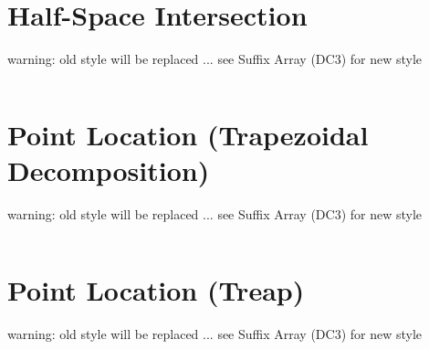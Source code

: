 \documentclass{book}
\begin{document}
\section{Half-Space Intersection}
warning: old style will be replaced ... see Suffix Array (DC3) for new style\begin{lstlisting}[language=C++,title={Half-Space Intersection.hpp (0 bytes, 0 lines)}]
\end{lstlisting}
\section{Point Location (Trapezoidal Decomposition)}
warning: old style will be replaced ... see Suffix Array (DC3) for new style\begin{lstlisting}[language=C++,title={Point Location (Trapezoidal Decomposition).hpp (0 bytes, 0 lines)}]
\end{lstlisting}
\section{Point Location (Treap)}
warning: old style will be replaced ... see Suffix Array (DC3) for new style\begin{lstlisting}[language=C++,title={Point Location (Treap).hpp (0 bytes, 0 lines)}]
\end{lstlisting}
\end{document}
